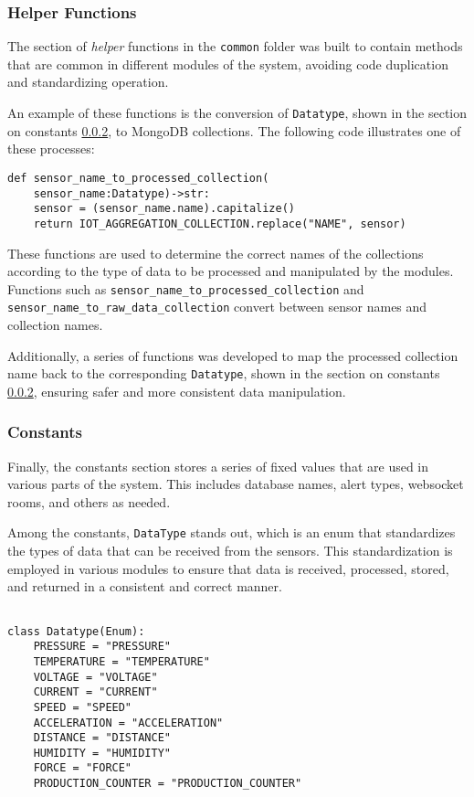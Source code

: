 \subsubsection{Helper Functions}\label{subsubsec:helpers}

The section of \textit{helper} functions in the \texttt{common} folder was built to contain methods that are common in different modules of the system, avoiding code duplication and standardizing operation.

An example of these functions is the conversion of \texttt{Datatype}, shown in the section on constants \ref{subsubsec:constantes}, to MongoDB collections. The following code illustrates one of these processes:

\begin{Verbatim}[fontsize=\small, baselinestretch=0.6]
def sensor_name_to_processed_collection(
    sensor_name:Datatype)->str:
    sensor = (sensor_name.name).capitalize()
    return IOT_AGGREGATION_COLLECTION.replace("NAME", sensor)
\end{Verbatim}

These functions are used to determine the correct names of the collections according to the type of data to be processed and manipulated by the modules. Functions such as \texttt{sensor\_name\_to\_processed\_collection} and \texttt{sensor\_name\_to\_raw\_data\_collection} convert between sensor names and collection names.

Additionally, a series of functions was developed to map the processed collection name back to the corresponding \texttt{Datatype}, shown in the section on constants \ref{subsubsec:constantes}, ensuring safer and more consistent data manipulation.

\subsubsection{Constants}\label{subsubsec:constantes}
Finally, the constants section stores a series of fixed values that are used in various parts of the system. This includes database names, alert types, websocket rooms, and others as needed.

Among the constants, \texttt{DataType} stands out, which is an enum that standardizes the types of data that can be received from the sensors. This standardization is employed in various modules to ensure that data is received, processed, stored, and returned in a consistent and correct manner.

\begin{Verbatim}[fontsize=\small, baselinestretch=0.6]

class Datatype(Enum):
    PRESSURE = "PRESSURE"
    TEMPERATURE = "TEMPERATURE"
    VOLTAGE = "VOLTAGE"
    CURRENT = "CURRENT"
    SPEED = "SPEED"
    ACCELERATION = "ACCELERATION"
    DISTANCE = "DISTANCE"
    HUMIDITY = "HUMIDITY"
    FORCE = "FORCE"
    PRODUCTION_COUNTER = "PRODUCTION_COUNTER"
\end{Verbatim}

